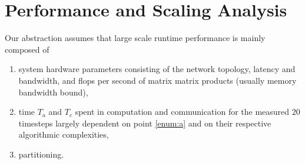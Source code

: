 \documentclass{sig-alternate}
\begin{document}



\section{Performance and Scaling Analysis}
\label{sec:analysis}
Our abstraction assumes that large scale runtime performance is mainly composed
of
\begin{enumerate}
  \item system hardware parameters consisting of the network topology, latency and
    bandwidth\label{enum:a}, and flops per second of matrix matrix products
    (usually memory bandwidth bound), 
  \item time $T_a$ and $T_c$ spent in computation and communication for the measured 
 $20$ timesteps largely dependent on point \ref{enum:a} and on their respective algorithmic complexities,
  \item partitioning.\label{enum:c}
\end{enumerate}
\end{document}
